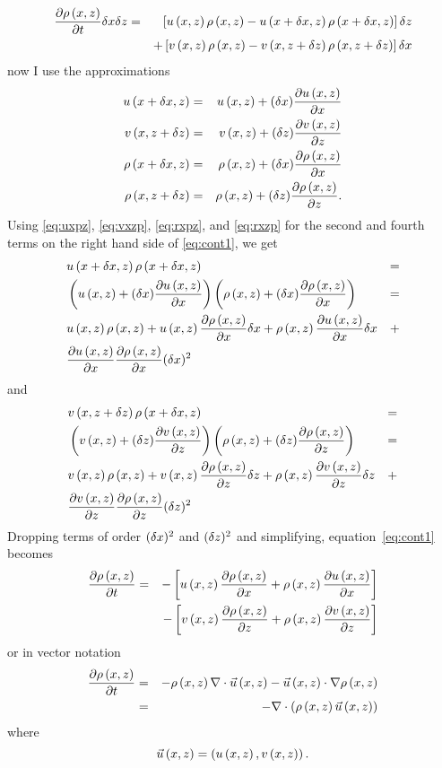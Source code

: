 \documentclass[12pt,twoside]{article}
\begin{document}
\begin{eqnarray}
\drdt \dx \dz & = & \left [ \uxz \rxz - \uxpz \rxpz \right ]\dz \nonumber \\ 
&  &  + \left [ \vxz \rxz - \vxzp \rxzp \right ]\dx \label{eq:cont1}
\end{eqnarray}
now I use the approximations
\begin{eqnarray}
\uxpz & = & \uxz + (\dx)\dudx \label{eq:uxpz} \\
\vxzp & = & \vxz + (\dz)\dvdz \label{eq:vxzp}\\
\rxpz & = & \rxz + (\dx)\drdx \label{eq:rxpz}\\
\rxzp & = & \rxz + (\dz)\drdz \label{eq:rxzp}.
\end{eqnarray}
Using \ref{eq:uxpz}, \ref{eq:vxzp}, \ref{eq:rxpz}, and \ref{eq:rxzp}
for the second and fourth terms on the right hand side of  \ref{eq:cont1}, we get
\begin{eqnarray}
& \uxpz \rxpz & =  \nonumber \\
&\left (\uxz+(\dx)\dudx\right )\left (\rxz+(\dx)\drdx\right ) & = \nonumber
\\        
& \uxz \rxz + \uxz \drdx \dx + \rxz \dudx \dx & +  \nonumber \\ 
& \dudx \drdx (\dx)^2 
\end{eqnarray}
and
\begin{eqnarray} 
& \vxzp \rxpz & =  \nonumber \\ 
&\left (\vxz+(\dz)\dvdz\right )\left (\rxz+(\dz)\drdz\right ) & = \nonumber
\\         
& \vxz \rxz + \vxz \drdz \dz + \rxz \dvdz \dz & +  \nonumber \\  &
\dvdz \drdz (\dz)^2 
\end{eqnarray}
Dropping terms of order $(\dx)^2$ and $(\dz)^2 $ and simplifying,
equation~\ref{eq:cont1} becomes
\begin{eqnarray}
\drdt & = & - \left [ \uxz \drdx + \rxz \dudx \right ] \nonumber \\  
&  &      - \left [ \vxz \drdz + \rxz \dvdz \right ]
\label{eq:cont2}
\end{eqnarray}
or in vector notation
\begin{eqnarray}
\drdt & = & - \rxz \nabla \cdot \Uxz - \Uxz \cdot \nabla \rxz \nonumber \\
& = &  - \nabla \cdot \left ( \rxz\Uxz \right )
\label{eq:veccont2}
\end{eqnarray}
where
\begin{equation}
\Uxz = \left ( \uxz , \vxz \right ).
\end{equation}
\end{document}
